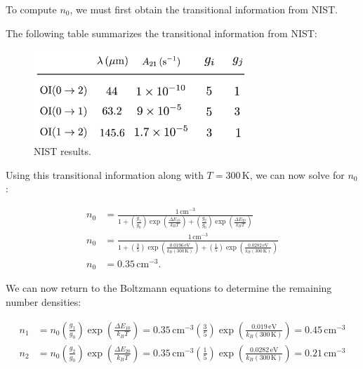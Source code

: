 \documentclass[12pt]{article}
\begin{document}
To compute $n_0$, we must first obtain the transitional information from NIST.

\newpage

The following table summarizes the transitional information from NIST:

\begin{figure}[h] \label{fig:table2}
\includegraphics[width=8cm]{table2.png}
\centering
\caption{NIST results.}
\end{figure}

Using this transitional information along with $T=300\,\mathrm{K}$, we can now solve for $n_0$:

\begin{equation*}
\begin{split}
n_0 &= \frac{1\,\mathrm{cm^{-3}}}{1 + \left(\frac{g_1}{g_0}\right)\exp\left(\frac{\Delta E_{10}}{k_BT}\right) + \left(\frac{g_2}{g_0}\right)\exp\left(\frac{\Delta E_{20}}{k_BT}\right)}\\
n_0 &= \frac{1\,\mathrm{cm^{-3}}}{1 + \left(\frac{3}{5}\right)\exp\left(\frac{0.0196\,\mathrm{eV}}{k_B(300\,\mathrm{K})}\right) + \left(\frac{1}{5}\right)\exp\left(\frac{0.0282\,\mathrm{eV}}{k_B(300\,\mathrm{K})}\right)}\\
n_0 &= 0.35\,\mathrm{cm^{-3}}.
\end{split}
\end{equation*}

We can now return to the Boltzmann equations to determine the remaining number densities:

\begin{equation*}
\begin{split}
n_1 &= n_0\left(\frac{g_1}{g_0}\right)\exp\left(\frac{\Delta E_{10}}{k_BT}\right) = 0.35\,\mathrm{cm^{-3}}\left(\frac{3}{5}\right)\exp\left(\frac{0.019\,\mathrm{eV}}{k_B(300\,\mathrm{K})}\right) = 0.45\,\mathrm{cm^{-3}}\\
n_2 &= n_0\left(\frac{g_2}{g_0}\right)\exp\left(\frac{\Delta E_{20}}{k_BT}\right) = 0.35\,\mathrm{cm^{-3}}\left(\frac{1}{5}\right)\exp\left(\frac{0.0282\,\mathrm{eV}}{k_B(300\,\mathrm{K})}\right) = 0.21\,\mathrm{cm^{-3}}
\end{split}
\end{equation*}
\end{document}
